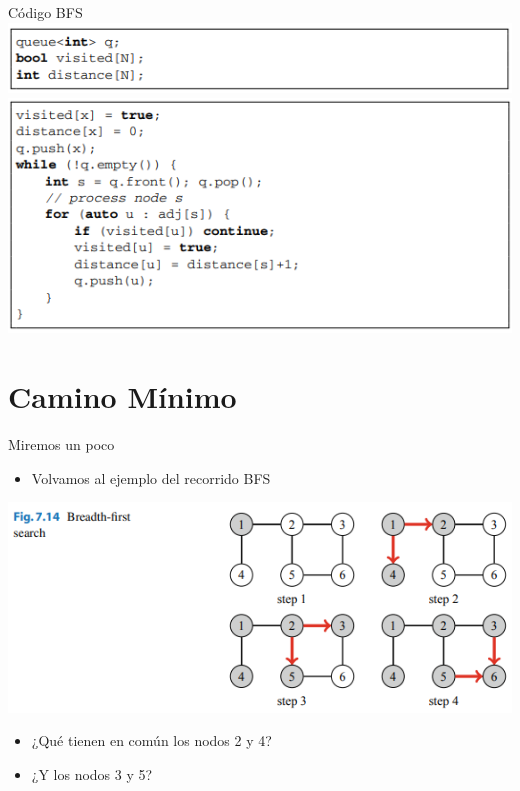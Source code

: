 \documentclass{beamer}
\begin{document}
\begin{frame}{Código BFS}
	\centering
	\includegraphics[]{figuras/estructuras bfs.PNG}
	\includegraphics[]{figuras/bfs.PNG}
\end{frame}

\section{Camino Mínimo}

\begin{frame}{Miremos un poco}
	\begin{itemize}
		\item Volvamos al ejemplo del recorrido BFS
	\end{itemize}
	
	\centering
	\includegraphics[scale=0.7]{figuras/bfs_ejecucion.PNG}
	\begin{itemize}
		\item ¿Qué tienen en común los nodos 2 y 4?
		\item ¿Y los nodos 3 y 5?
	\end{itemize}
\end{frame}
\end{document}

